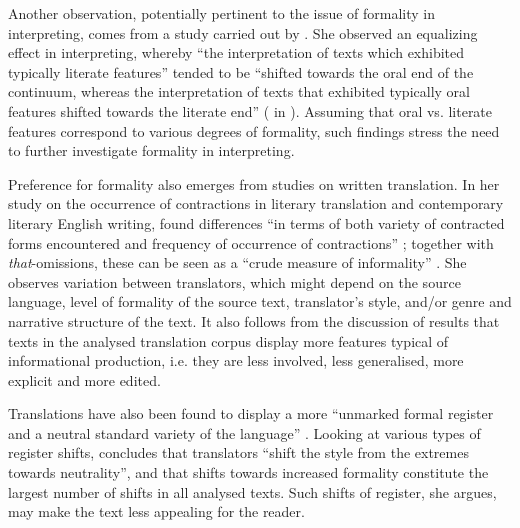 \documentclass[output=paper]{langscibook}
\begin{document}
Another observation, potentially pertinent to the issue of formality in interpreting, comes from a study carried out by \citet{Shlesinger1989}. She observed an equalizing effect in interpreting, whereby “the interpretation of texts which exhibited typically literate features” tended to be “shifted towards the oral end of the continuum, whereas the interpretation of texts that exhibited typically oral features shifted towards the literate end” (\citealt{Shlesinger1989} in \citealt[54]{ShlesingerOrdan2012}). Assuming that oral vs. literate features correspond to various degrees of formality, such findings stress the need to further investigate formality in interpreting.

Preference for formality also emerges from studies on written translation. In her study on the occurrence of contractions in literary translation and contemporary literary English writing, \citet{Olohan2003} found differences “in terms of both variety of contracted forms encountered and frequency of occurrence of contractions” \citep[59]{Olohan2003}; together with \textit{that}{}-omissions, these can be seen as a “crude measure of informality” \citep[101]{Olohan2004}. She observes variation between translators, which might depend on the source language, level of formality of the source text, translator’s style, and/or genre and narrative structure of the text. It also follows from the discussion of results that texts in the analysed translation corpus display more features typical of   informational production, i.e. they are less involved, less generalised, more explicit and more edited.

Translations have also been found to display a more “unmarked formal register and a neutral standard variety of the language” \citep[125]{Moe2010}. Looking at various types of register shifts, \citet[136]{Moe2010} concludes that translators “shift the style from the extremes towards neutrality”, and that shifts towards increased formality constitute the largest number of shifts in all analysed texts. Such shifts of register, she argues, may make the text less appealing for the reader.
\end{document}
